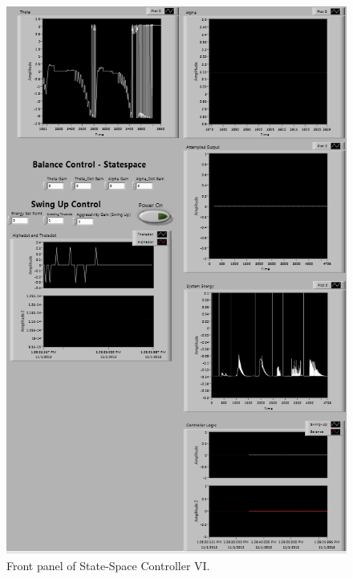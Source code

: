 \documentclass{article}
\theoremstyle{plain}
\theoremstyle{definition}
\theoremstyle{remark}
\begin{document}
\begin{figure}[htb]
\begin{center}
\includegraphics[width = 12cm]{q6_b1.png}
\end{center}
\caption{Front panel of State-Space Controller VI.}
\label{q6_b1}
\end{figure}
\end{document}
